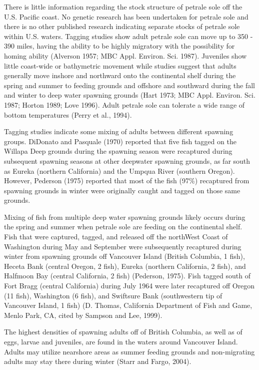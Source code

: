\documentclass[12pt,]{article}
\begin{document}
There is little information regarding the stock structure of petrale
sole off the U.S. Pacific coast. No genetic research has been undertaken
for petrale sole and there is no other published research indicating
separate stocks of petrale sole within U.S. waters. Tagging studies show
adult petrale sole can move up to 350 - 390 miles, having the ability to
be highly migratory with the possibility for homing ability (Alverson
1957; MBC Appl. Environ. Sci. 1987). Juveniles show little coast-wide or
bathymetric movement while studies suggest that adults generally move
inshore and northward onto the continental shelf during the spring and
summer to feeding grounds and offshore and southward during the fall and
winter to deep water spawning grounds (Hart 1973; MBC Appl. Environ.
Sci. 1987; Horton 1989; Love 1996). Adult petrale sole can tolerate a
wide range of bottom temperatures (Perry et al., 1994).

Tagging studies indicate some mixing of adults between different
spawning groups. DiDonato and Pasquale (1970) reported that five fish
tagged on the Willapa Deep grounds during the spawning season were
recaptured during subsequent spawning seasons at other deepwater
spawning grounds, as far south as Eureka (northern California) and the
Umpqua River (southern Oregon). However, Pederson (1975) reported that
most of the fish (97\%) recaptured from spawning grounds in winter were
originally caught and tagged on those same grounds.

Mixing of fish from multiple deep water spawning grounds likely occurs
during the spring and summer when petrale sole are feeding on the
continental shelf. Fish that were captured, tagged, and released off the
northWest Coast of Washington during May and September were subsequently
recaptured during winter from spawning grounds off Vancouver Island
(British Columbia, 1 fish), Heceta Bank (central Oregon, 2 fish), Eureka
(northern California, 2 fish), and Halfmoon Bay (central California, 2
fish) (Pederson, 1975). Fish tagged south of Fort Bragg (central
California) during July 1964 were later recaptured off Oregon (11 fish),
Washington (6 fish), and Swiftsure Bank (southwestern tip of Vancouver
Island, 1 fish) (D. Thomas, California Department of Fish and Game,
Menlo Park, CA, cited by Sampson and Lee, 1999).

The highest densities of spawning adults off of British Columbia, as
well as of eggs, larvae and juveniles, are found in the waters around
Vancouver Island. Adults may utilize nearshore areas as summer feeding
grounds and non-migrating adults may stay there during winter (Starr and
Fargo, 2004).
\end{document}
